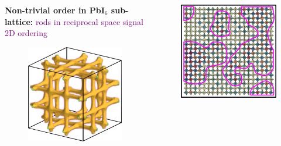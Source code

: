 \documentclass[12pt]{beamer}
\begin{document}
{

\begin{frame} %

\begin{columns}
\begin{column}{0.5\textwidth}

\textbf{Non-trivial order in PbI$_6$ sub-lattice:} \textcolor{purple}{rods in reciprocal space signal 2D ordering}

\begin{figure}
    \includegraphics[width=0.9\linewidth]{figs/rods.png}
\end{figure}

\end{column}
\begin{column}{0.5\textwidth}

\begin{figure}
    \includegraphics[width=0.9\linewidth]{figs/pancakes_2.png}
\end{figure}


\end{column}
\end{columns}
\end{frame}}
\end{document}
